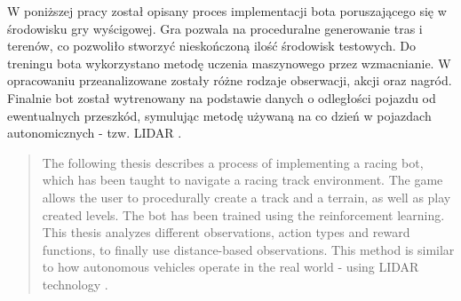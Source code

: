 \begin{streszczenie}
    W poniższej pracy został opisany proces implementacji bota poruszającego się w środowisku gry wyścigowej. Gra pozwala na proceduralne generowanie tras i terenów, co pozwoliło stworzyć nieskończoną ilość środowisk testowych. Do treningu bota wykorzystano metodę uczenia maszynowego przez wzmacnianie. W opracowaniu przeanalizowane zostały różne rodzaje obserwacji, akcji oraz nagród. Finalnie bot został wytrenowany na podstawie danych o odległości pojazdu od ewentualnych przeszkód, symulując metodę używaną na co dzień w pojazdach autonomicznych - tzw. LIDAR \cite{Lidar}.
\end{streszczenie}

\vspace*{1cm}

\begin{abstract}
    The following thesis describes a process of implementing a racing bot, which has been taught to navigate a racing track environment. The game allows the user to procedurally create a track and a terrain, as well as play created levels. The bot has been trained using the reinforcement learning. This thesis analyzes different observations, action types and reward functions, to finally use distance-based observations. This method is similar to how autonomous vehicles operate in the real world - using LIDAR technology \cite{Lidar}.
\end{abstract}